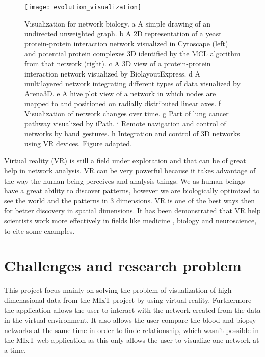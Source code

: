 \begin{figure}[h!]
    \newlength{\tempheight}
    \setlength{\tempheight}{15ex}
    \centering%
    \texttt{[image: evolution\_visualization]}
    \caption{Visualization for network biology. a A simple drawing of an undirected unweighted graph. b A 2D representation of a yeast protein-protein interaction network visualized in Cytoscape (left) and potential protein complexes 3D identified by the MCL algorithm from that network (right). c A 3D view of a protein-protein interaction network visualized by BiolayoutExpress. d A multilayered network integrating different types of data visualized by Arena3D. e A hive plot view of a network in which nodes are mapped to and positioned on radially distributed linear axes. f Visualization of network changes over time. g Part of lung cancer pathway visualized by iPath. i Remote navigation and control of networks by hand gestures. h Integration and control of 3D networks using VR devices. Figure adapted\cite{pavlopoulos_malliarakis_papanikolaou_theodosiou_enright_iliopoulos_2015}.}
    \label{fig:network_biology_evolution}
\end{figure}%

Virtual reality (VR) is still a field under exploration and that can be of great help in network analysis. VR can be very powerful because it takes advantage of the way the human being perceives and analysis things. We as human beings have a great ability to discover patterns, however we are biologically optimized to see the world and the patterns in 3 dimensions. VR is one of the best ways then for better discovery in spatial dimensions. It has been demonstrated that VR help scientists work more effectively in fields like medicine \cite{Laver11}\cite{xia_ip_samman_wong_gateno_wang_yeung_kot_tideman_2001}\cite{brain_damage_rehab}, biology\cite{10.1093/bioinformatics/bti581}\cite{thorley_lawson_duca_shapiro_2008} and neuroscience\cite{bohil_alicea_biocca_2011}\cite{minderer_harvey_donato_moser_2016}, to cite some examples.


\section{Challenges and research problem}
This project focus mainly on solving the problem of visualization of high dimenasional data from the MIxT project by using virtual reality. Furthermore the application allows the user to interact with the network created from the data in the virtual environment. It also allows the user compare the blood and biopsy networks at the same time in order to finde relationship, which wasn't possible in the MIxT web application as this only allows the user to visualize one network at a time.

